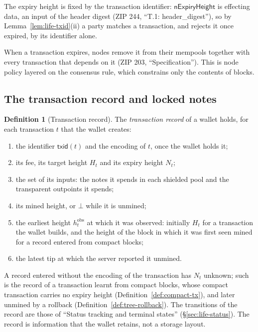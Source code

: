 \documentclass[11pt,a4paper]{article}
\theoremstyle{definition}
\newtheorem{definition}[theorem]{Definition}
\begin{document}
The expiry height is fixed by the transaction identifier:
$\mathsf{nExpiryHeight}$ is effecting data, an input of the header digest
(ZIP 244, ``T.1: header\_digest''), so by Lemma~\ref{lem:life-txid}(ii) a
party matches a transaction, and rejects it once expired, by its identifier
alone.

When a transaction expires, nodes remove it from their mempools together
with every transaction that depends on it (ZIP 203, ``Specification''). This
is node policy layered on the consensus rule, which constrains only the
contents of blocks.

\subsection{The transaction record and locked notes}\label{sec:spend-locks}

\begin{definition}[Transaction record]\label{def:spend-record}
The \emph{transaction record} of a wallet holds, for each transaction $t$
that the wallet creates:
\begin{enumerate}[label=(\roman*)]
\item the identifier $\mathsf{txid}(t)$ and the encoding of $t$, once the
  wallet holds it;
\item its fee, its target height $H_t$ and its expiry height $N_t$;
\item the set of its inputs: the notes it spends in each shielded pool and
  the transparent outpoints it spends;
\item its mined height, or $\bot$ while it is unmined;
\item the earliest height $h^{\mathrm{obs}}_t$ at which it was observed:
  initially $H_t$ for a transaction the wallet builds, and the height of
  the block in which it was first seen mined for a record entered from
  compact blocks;
\item the latest tip at which the server reported it unmined.
\end{enumerate}
A record entered without the encoding of the transaction has $N_t$
unknown; such is the record of a transaction learnt from compact blocks,
whose compact transaction carries no expiry height
(Definition~\ref{def:compact-tx}), and later unmined by a rollback
(Definition~\ref{def:tree-rollback}). The transitions of the record are
those of ``Status tracking and terminal states'' (\S\ref{sec:life-status}).
The record is information that the wallet retains, not a storage layout.
\end{definition}
\end{document}
